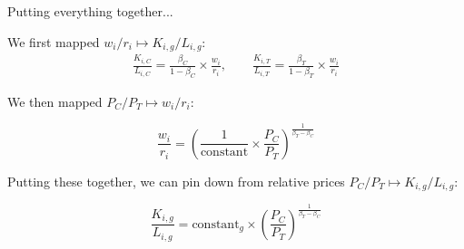 \documentclass[notes,11pt, aspectratio=169, xcolor=table]{beamer}
\newenvironment{wideitemize}{\itemize\addtolength{\itemsep}{10pt}}{\enditemize}
\begin{document}
\begin{frame}{Putting everything together...}

        \begin{wideitemize}
            \item We first mapped $w_i/r_i \mapsto K_{i,g}/L_{i,g}$:
\begin{eqnarray*}\label{eq: capital-labor}
    \frac{K_{i,C}}{L_{i,C}} = \frac{\beta_C}{1-\beta_C} \times \frac{w_i}{r_i}, \qquad \frac{K_{i,T}}{L_{i,T}} = \frac{\beta_T}{1-\beta_T} \times \frac{w_i}{r_i} 
\end{eqnarray*}        
            \item We then mapped $P_C/P_T \mapsto w_i/r_i$:

            \begin{equation*}
                \frac{w_i}{r_i} = \left( \frac{1}{\text{constant}} \times  \frac{P_{C}}{P_{T}} \right)^{\frac{1}{\beta_T-\beta_C}}
            \end{equation*}

            \item Putting these together, we can pin down from relative prices $P_C / P_T \mapsto K_{i,g}/L_{i,g}$:

            \begin{equation*}
                \frac{K_{i,g}}{L_{i,g}} = \text{constant}_g \times  \left(  \frac{P_{C}}{P_{T}} \right)^{\frac{1}{\beta_T-\beta_C}}
            \end{equation*}

\end{wideitemize}
\end{frame}
\end{document}
